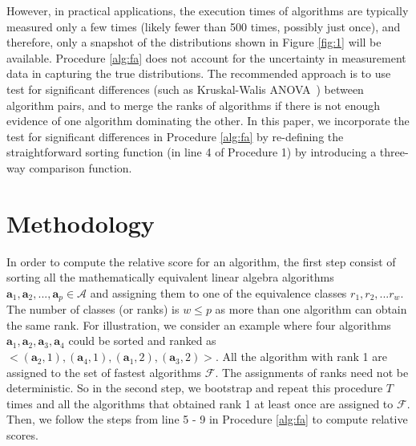 \documentclass[conference]{IEEEtran}
\begin{document}
However, in practical applications, the execution times of algorithms are typically
measured only a few times (likely fewer than 500 times, possibly just once), and therefore, only a snapshot of the distributions
shown in Figure \ref{fig:1} will be available. Procedure \ref{alg:fa} does not account for the uncertainty in measurement data in capturing the true distributions. 
The recommended approach is to use test for significant differences (such as Kruskal-Walis
ANOVA~\cite{hoefler2015scientific}) between algorithm pairs, and to merge the ranks of algorithms if there is not enough
evidence of one algorithm dominating the other. In this paper, we incorporate the test for significant differences in
Procedure \ref{alg:fa} by re-defining the straightforward sorting function (in line 4 of Procedure 1) by introducing a
three-way comparison function. 
\bigskip



\section{Methodology}
\label{sec:met}

In order to compute the relative score for an algorithm, the first step consist of sorting all the mathematically equivalent linear algebra algorithms $\mathbf{a}_1,\mathbf{a}_2, ..., \mathbf{a}_p \in \mathcal{A}$ and assigning them to one of the equivalence classes $r_1, r_2, ...r_w$. The number of classes (or ranks) is $w \le p$ as more than one algorithm can obtain the same rank. For illustration, we consider an example where four algorithms $\mathbf{a}_1,\mathbf{a}_2, \mathbf{a}_3, \mathbf{a}_4$ could be sorted and ranked as $< (\mathbf{a}_2,1), (\mathbf{a}_4,1), (\mathbf{a}_1,2), (\mathbf{a}_3,2) >$. All the algorithm with rank 1 are assigned to the set of fastest algorithms $\mathcal{F}$. The assignments of ranks need not be deterministic. So in the second step, we bootstrap and repeat this procedure $T$ times and all the algorithms that obtained rank 1 at least once are assigned to $\mathcal{F}$. Then, we follow the steps from line 5 - 9 in Procedure \ref{alg:fa} to compute relative scores. 
\end{document}
